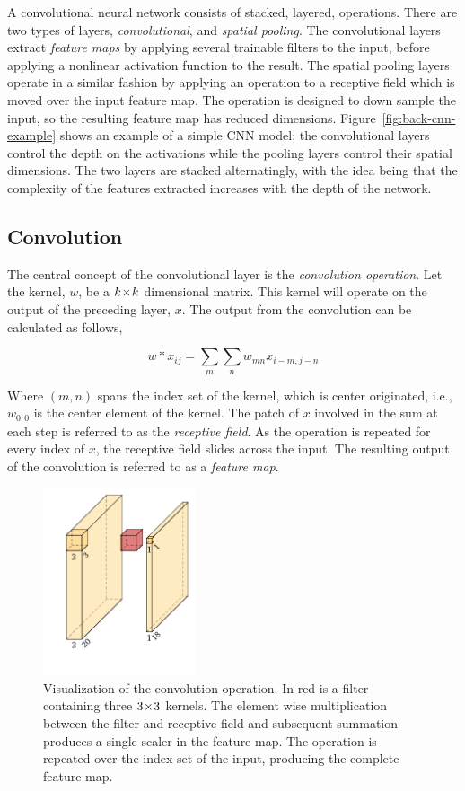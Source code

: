 A convolutional neural network consists of stacked, layered, operations.
There are two types of layers, \textit{convolutional}, and \textit{spatial pooling}.
The convolutional layers extract \textit{feature maps} by applying several trainable filters to the input, before applying a nonlinear activation function to the result.
The spatial pooling layers operate in a similar fashion by applying an operation to a receptive field which is moved over the input feature map.
The operation is designed to down sample the input, so the resulting feature map has reduced dimensions.
Figure~\ref{fig:back-cnn-example} shows an example of a simple CNN model; the convolutional layers control the depth on the activations while the pooling layers control their spatial dimensions.
The two layers are stacked alternatingly, with the idea being that the complexity of the features extracted increases with the depth of the network.%

\subsection{Convolution}
The central concept of the convolutional layer is the \textit{convolution operation}.
Let the kernel, \(w\), be a \(k\!\times \! k\) dimensional matrix.
This kernel will operate on the output of the preceding layer, \(x\).
The output from the convolution can be calculated as follows,

\[w\ast x_{ij}=\sum_{m}\sum_{n}  w_{mn}x_{i-m,j-n}\]

Where \((m,n)\) spans the index set of the kernel, which is center originated, i.e., \(w_{0,0}\) is the center element of the kernel.
The patch of \(x\) involved in the sum at each step is referred to as the \textit{receptive field}.
As the operation is repeated for every index of \(x\), the receptive field slides across the input.
The resulting output of the convolution is referred to as a \textit{feature map}.

\begin{figure}[htb]
  \centering
  \includegraphics[width=0.4\textwidth]{figs/background/conv.pdf}
  \caption[Convolution operation]{Visualization of the convolution operation.
In red is a filter containing three \(3\!\times \! 3\) kernels.
The element wise multiplication between the filter and receptive field and subsequent summation produces a single scaler in the feature map.
The operation is repeated over the index set of the input, producing the complete feature map.}\label{fig:cnn}
\end{figure}

